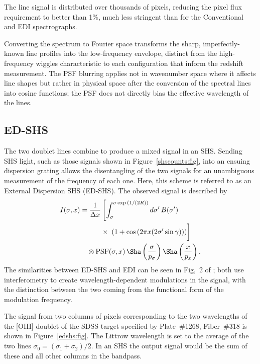 \documentclass[preprint2, 10pt]{aastex}
\begin{document}
The line signal is distributed over thousands of pixels, reducing the pixel flux requirement to better than 1\%, much less stringent
than for the Conventional and EDI spectrographs.

Converting the spectrum to Fourier space transforms the sharp, imperfectly-known line profiles into the low-frequency envelope,
distinct from the high-frequency wiggles characteristic to each configuration that inform the redshift measurement.
The PSF blurring applies not in wavenumber space where it affects
line shapes but rather in physical space after the conversion of the spectral lines into cosine functions; the PSF does not directly bias the effective
wavelength of the lines. 


\subsection{ED-SHS} 

The two doublet lines combine to produce a mixed signal in an SHS.  Sending SHS light, such as those signals shown
in  Figure~\ref{shscounts:fig}, into an ensuing dispersion grating
allows the disentangling of the two signals for an unambiguous measurement of the frequency of each one.  Here, 
this scheme is 
referred to as an External Dispersion SHS (ED-SHS).
The observed signal is described by
\begin{align}
I(\sigma,x) &= \frac{1}{\Delta x}\left[\int^{\sigma \exp{\left(1/(2R)\right)}}_{\sigma} d\sigma'\,B(\sigma') \right.\nonumber\\ 
& \quad\qquad \times \left.\vphantom{\int_{0}^{\infty}} \left(1+\cos{\left(2 \pi x (2\sigma' \sin{\gamma})\right)}\right) \right] \nonumber\\ 
& \quad \otimes \mbox{PSF}(\sigma,x)\, \Sha\left(\frac{\sigma}{p_\sigma}\right) \Sha\left(\frac{x}{p_x}\right).
\label{edishssig:eqn}
\end{align}
The similarities between ED-SHS and EDI can be seen in Fig,\ 2 of \citet{2003PASP..115..255E}; both use
interferometry to create wavelength-dependent modulations in the signal, with the distinction between the two coming
from the functional form of
the modulation frequency.


The signal from two columns of pixels corresponding to the two wavelengths of
the [OIII] doublet of the
SDSS target specified by Plate~\#1268, Fiber~\#318 is shown in Figure~\ref{edshs:fig}.
The Littrow wavelength is set to the average of the two lines  $\sigma_0=(\sigma_1+\sigma_2)/2$.
In an SHS the output signal would be the sum of these and all other columns in the bandpass.
\end{document}
